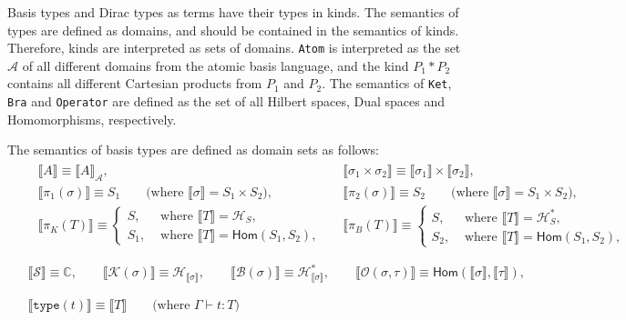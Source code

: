 \documentclass[manuscript, review, timestamp]{acmart}
\newcommand*{\Sc}{\mathcal{S}}
\newcommand*{\K}{\mathcal{K}}
\newcommand*{\B}{\mathcal{B}}
\newcommand*{\Op}{\mathcal{O}}
\newcommand*{\sem}[1]{{\llbracket #1 \rrbracket}}
\begin{document}
Basis types and Dirac types as terms have their types in kinds. The semantics of types are defined as domains, and should be contained in the semantics of kinds. Therefore, kinds are interpreted as sets of domains. \texttt{Atom} is interpreted as the set $\mathcal{A}$ of all different domains from the atomic basis language, and the kind $P_1 * P_2$ contains all different Cartesian products from $P_1$ and $P_2$. The semantics of \texttt{Ket}, \texttt{Bra} and \texttt{Operator} are defined as the set of all Hilbert spaces, Dual spaces and Homomorphisms, respectively.


\begin{definition}
  The semantics of basis types are defined as domain sets as follows:
  \begin{align*}
    & \begin{aligned}
      & \sem{A} \equiv \sem{A}_\mathcal{A},
      \qquad
      && \sem{\sigma_1 \times \sigma_2} \equiv \sem{\sigma_1} \times \sem{\sigma_2}, \\
      & \sem{\pi_1(\sigma)} \equiv S_1 \qquad \text{(where $\sem{\sigma} = S_1 \times S_2$)},
      && \sem{\pi_2(\sigma)} \equiv S_2 \qquad \text{(where $\sem{\sigma} = S_1 \times S_2$)}, \\
      & \sem{\pi_K(T)} \equiv \left\{
        \begin{array}{ll}
          S, & \text{ where } \sem{T} = \mathcal{H}_S, \\
          S_1, & \text{ where } \sem{T} = \textsf{Hom}(S_1, S_2),
        \end{array}
      \right.
      && \sem{\pi_B(T)} \equiv \left\{
        \begin{array}{ll}
          S, & \text{ where } \sem{T} = \mathcal{H}^*_S, \\
          S_2, & \text{ where } \sem{T} = \textsf{Hom}(S_1, S_2),
        \end{array}
      \right.
    \end{aligned} \\
    \\
    & \begin{aligned}
      \sem{\Sc} \equiv \mathbb{C},
      \qquad
      \sem{\K(\sigma)} \equiv \mathcal{H}_{\sem{\sigma}}, 
      \qquad 
      \sem{\B(\sigma)} \equiv \mathcal{H}^*_{\sem{\sigma}},
      \qquad
      \sem{\Op(\sigma, \tau)} \equiv \textsf{Hom}(\sem{\sigma}, \sem{\tau}),
    \end{aligned} \\
    \\
    & \begin{aligned}
      \sem{\texttt{type}(t)} \equiv \sem{T} \qquad \text{(where $\Gamma \vdash t : T$)}
    \end{aligned}
  \end{align*}
\end{definition}
\end{document}
